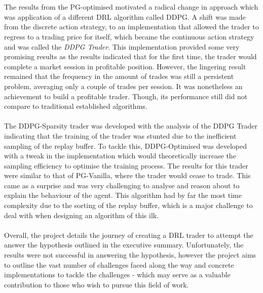 \documentclass[ %
                    author={Ashwinder Khurana},
                supervisor={Prof Dave Cliff},
                    degree={MEng},
                     title={The Deeply Reinforced Trader},
                  subtitle={},
                      type={enterprise},
                      year={2020} ]{dissertation}
\begin{document}
{\\
\\
The results from the PG-optimised motivated a radical change in approach which was application of a different DRL algorithm called DDPG. A shift was made from the discrete action strategy, to an implementation that allowed the trader to regress to a trading price for itself, which became the continuous action strategy and was called the \textit{DDPG Trader}. This implementation provided some very promising results as the results indicated that for the first time, the trader would complete a market session in profitable position. However, the lingering result remained that the frequency in the amount of trades was still a persistent problem, averaging only a couple of trades per session. It was nonetheless an achievement to build a profitable trader. Though, its performance still did not compare to traditional established algorithms. 
\\
\\
The DDPG-Sparsity trader was developed with the analysis of the DDPG Trader indicating that the training of the trader was stunted due to the inefficient sampling of the replay buffer. To tackle this, DDPG-Optimised was developed with a tweak in the implementation which would theoretically increase the sampling efficiency to optimise the training process. The results for this trader were similar to that of PG-Vanilla, where the trader would cease to trade. This came as a surprise and was very challenging to analyse and reason about to explain the behaviour of the agent. This algorithm had by far the most time complexity due to the sorting of the replay buffer, which is a major challenge to deal with when designing an algorithm of this ilk. 
\\
\\
\noindent
Overall, the project details the journey of creating a DRL trader to attempt the answer the hypothesis outlined in the executive summary. Unfortunately, the results were not successful in answering the hypothesis, however the project aims to outline the vast number of challenges faced along the way and concrete implementations to tackle the challenges - which may serve as a valuable contribution to those who wish to pursue this field of work.

 
}
\end{document}
